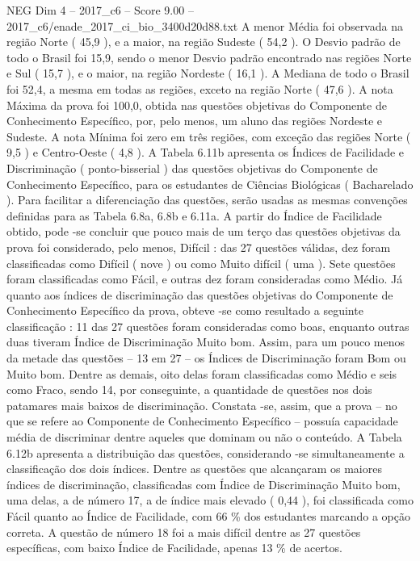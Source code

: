 \begin{textsample}{NEG Dim 4 – 2017\_c6 – Score 9.00 – 2017\_c6/enade\_2017\_ci\_bio\_3400d20d88.txt}
A menor Média foi observada na região Norte ( 45,9 ), e a maior, na região Sudeste ( 54,2 ).
O Desvio padrão de todo o Brasil foi 15,9, sendo o menor Desvio padrão encontrado nas regiões Norte e Sul ( 15,7 ), e o maior, na região Nordeste ( 16,1 ).
A Mediana de todo o Brasil foi 52,4, a mesma em todas as regiões, exceto na região Norte ( 47,6 ).
A nota Máxima da prova foi 100,0, obtida nas questões objetivas do Componente de Conhecimento Específico, por, pelo menos, um aluno das regiões Nordeste e Sudeste.
A nota Mínima foi zero em três regiões, com exceção das regiões Norte ( 9,5 ) e Centro-Oeste ( 4,8 ).
A Tabela 6.11b apresenta os Índices de Facilidade e Discriminação ( ponto-bisserial ) das questões objetivas do Componente de Conhecimento Específico, para os estudantes de Ciências Biológicas ( Bacharelado ).
Para facilitar a diferenciação das questões, serão usadas as mesmas convenções definidas para as Tabela 6.8a, 6.8b e 6.11a.
A partir do Índice de Facilidade obtido, pode -se concluir que pouco mais de um terço das questões objetivas da prova foi considerado, pelo menos, Difícil : das 27 questões válidas, dez foram classificadas como Difícil ( nove ) ou como Muito difícil ( uma ).
Sete questões foram classificadas como Fácil, e outras dez foram consideradas como Médio.
Já quanto aos índices de discriminação das questões objetivas do Componente de Conhecimento Específico da prova, obteve -se como resultado a seguinte classificação : 11 das 27 questões foram consideradas como boas, enquanto outras duas tiveram Índice de Discriminação Muito bom.
Assim, para um pouco menos da metade das questões – 13 em 27 – os Índices de Discriminação foram Bom ou Muito bom.
Dentre as demais, oito delas foram classificadas como Médio e seis como Fraco, sendo 14, por conseguinte, a quantidade de questões nos dois patamares mais baixos de discriminação.
Constata -se, assim, que a prova – no que se refere ao Componente de Conhecimento Específico – possuía capacidade média de discriminar dentre aqueles que dominam ou não o conteúdo.
A Tabela 6.12b apresenta a distribuição das questões, considerando -se simultaneamente a classificação dos dois índices.
Dentre as questões que alcançaram os maiores índices de discriminação, classificadas com Índice de Discriminação Muito bom, uma delas, a de número 17, a de índice mais elevado ( 0,44 ), foi classificada como Fácil quanto ao Índice de Facilidade, com 66 \% dos estudantes marcando a opção correta.
A questão de número 18 foi a mais difícil dentre as 27 questões específicas, com baixo Índice de Facilidade, apenas 13 \% de acertos.

\end{textsample}
